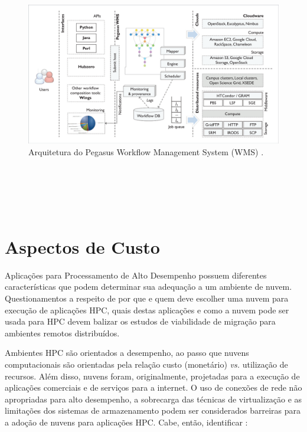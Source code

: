 \documentclass[tese,capa]{texufpel}
\begin{document}
\begin{figure}[H]
	\centerline{
		\includegraphics[scale=0.14]{images/PegasusWMS.png}}
	\caption[Arquitetura do Pegasus Workflow Management System (WMS)]{Arquitetura do Pegasus Workflow Management System (WMS) \cite{deelmanPegasusCloudScience2016}.}
	\label{img:PegasusWMS}
\end{figure}



\cite{deelmanPegasusWorkflowManagement2015}\\

\cite{deelmanEvolutionPegasusWorkflow2019}\\

\cite{deelmanPegasusWorkflowManagement2015a}\\

\cite{deelmanPegasusWorkflowManagement2021}\\

\cite{vahiCustomExecutionEnvironments2019}

\section{Aspectos de Custo}\label{aspectos_de_custo}

Aplicações para Processamento de Alto Desempenho possuem diferentes características que podem determinar sua adequação a um ambiente de nuvem. Questionamentos a respeito de por que e quem deve escolher uma nuvem para execução de aplicações HPC, quais destas aplicações e como a nuvem pode ser usada para HPC devem balizar os estudos de viabilidade de migração para ambientes remotos distribuídos. 

Ambientes HPC são orientados a desempenho, ao passo que nuvens computacionais são orientadas pela relação custo (monetário) \emph{vs.} utilização de recursos. Além disso, nuvens foram, originalmente, projetadas para a execução de aplicações comerciais e de serviços para a internet. O uso de conexões de rede não apropriadas para alto desempenho, a sobrecarga das técnicas de virtualização e as limitações dos sistemas de armazenamento podem ser considerados barreiras para a adoção de nuvens para aplicações HPC. Cabe, então, identificar \cite{guptaEvaluatingImprovingPerformance2016d}:
\end{document}
